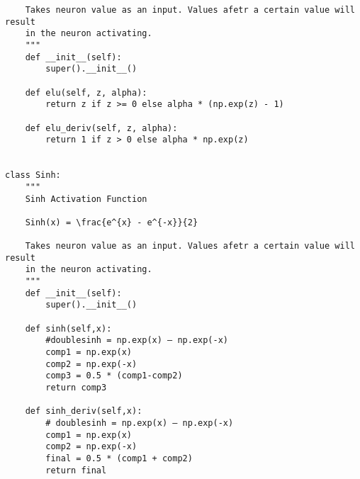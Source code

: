 \documentclass{article}
\begin{document}
\begin{lstlisting}
    Takes neuron value as an input. Values afetr a certain value will result
    in the neuron activating.
    """
    def __init__(self):
        super().__init__()

    def elu(self, z, alpha):
        return z if z >= 0 else alpha * (np.exp(z) - 1)

    def elu_deriv(self, z, alpha):
        return 1 if z > 0 else alpha * np.exp(z)


class Sinh:
    """
    Sinh Activation Function

    Sinh(x) = \frac{e^{x} - e^{-x}}{2}

    Takes neuron value as an input. Values afetr a certain value will result
    in the neuron activating.
    """
    def __init__(self):
        super().__init__()

    def sinh(self,x):
        #doublesinh = np.exp(x) – np.exp(-x)
        comp1 = np.exp(x)
        comp2 = np.exp(-x)
        comp3 = 0.5 * (comp1-comp2)
        return comp3

    def sinh_deriv(self,x):
        # doublesinh = np.exp(x) – np.exp(-x)
        comp1 = np.exp(x)
        comp2 = np.exp(-x)
        final = 0.5 * (comp1 + comp2)
        return final








\end{lstlisting}
\clearpage
\end{document}
